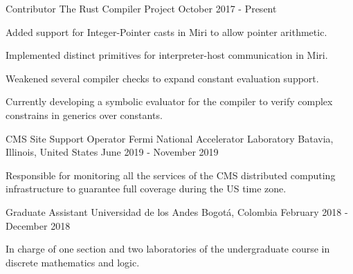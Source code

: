 


\begin{cventries}
    \cventry
    {Contributor}
    {The Rust Compiler Project}
    {}
    {October 2017 - Present }
    {
        \begin{cvitems}
        \item Added support for Integer-Pointer casts in Miri to allow pointer arithmetic.
        \item Implemented distinct primitives for interpreter-host communication in Miri.
        \item Weakened several compiler checks to expand constant evaluation support.
        \item Currently developing a symbolic evaluator for the compiler to verify complex constrains in generics over constants.
        \end{cvitems}
    }
    \cventry
    {CMS Site Support Operator}
    {Fermi National Accelerator Laboratory}
    {Batavia, Illinois, United States}
    {June 2019 - November 2019}
    {
        \begin{cvitems}
        \item{Responsible for monitoring all the services of the CMS distributed computing infrastructure to guarantee full coverage during the US time zone.}
        \end{cvitems}
    }

    \cventry
    {Graduate Assistant}
    {Universidad de los Andes}
    {Bogotá, Colombia}
    {February 2018 - December 2018}
    {
        \begin{cvitems}
        \item{In charge of one section and two laboratories of the undergraduate course in discrete mathematics and logic.}
        \end{cvitems}
    }


\end{cventries}
